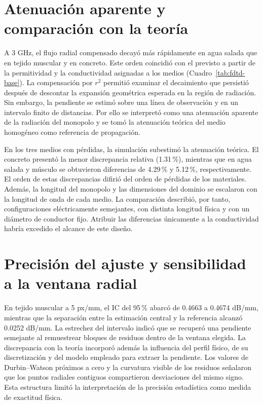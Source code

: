 \section{Atenuación aparente y comparación con la teoría}
A 3 GHz, el flujo radial compensado decayó más rápidamente en agua salada que en tejido muscular y en concreto. Este orden coincidió con el previsto a partir de la permitividad y la conductividad asignadas a los medios (Cuadro~\ref{tab:fdtd-base}). La compensación por $r^2$ permitió examinar el decaimiento que persistió después de descontar la expansión geométrica esperada en la región de radiación. Sin embargo, la pendiente se estimó sobre una línea de observación y en un intervalo finito de distancias. Por ello se interpretó como una atenuación aparente de la radiación del monopolo y se tomó la atenuación teórica del medio homogéneo como referencia de propagación.

En los tres medios con pérdidas, la simulación subestimó la atenuación teórica. El concreto presentó la menor discrepancia relativa (1.31\,\%), mientras que en agua salada y músculo se obtuvieron diferencias de 4.29\,\% y 5.12\,\%, respectivamente. El orden de estas discrepancias difirió del orden de pérdidas de los materiales. Además, la longitud del monopolo y las dimensiones del dominio se escalaron con la longitud de onda de cada medio. La comparación describió, por tanto, configuraciones eléctricamente semejantes, con distinta longitud física y con un diámetro de conductor fijo. Atribuir las diferencias únicamente a la conductividad habría excedido el alcance de este diseño.

\section{Precisión del ajuste y sensibilidad a la ventana radial}
En tejido muscular a 5 px/mm, el IC del 95\,\% abarcó de 0.4663 a 0.4674 dB/mm, mientras que la separación entre la estimación central y la referencia alcanzó 0.0252 dB/mm. La estrechez del intervalo indicó que se recuperó una pendiente semejante al remuestrear bloques de residuos dentro de la ventana elegida. La discrepancia con la teoría incorporó además la influencia del perfil físico, de su discretización y del modelo empleado para extraer la pendiente. Los valores de Durbin--Watson próximos a cero y la curvatura visible de los residuos señalaron que los puntos radiales contiguos compartieron desviaciones del mismo signo. Esta estructura limitó la interpretación de la precisión estadística como medida de exactitud física.


